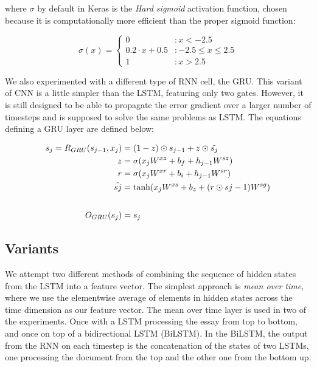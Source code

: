 where $\sigma$ by default in Keras is the \emph{Hard sigmoid} activation
function, chosen because it is computationally more efficient than the proper
sigmoid function:

\begin{equation}
  \sigma(x) = \begin{cases}
    0                 & : x < -2.5 \\
    0.2 \cdot x + 0.5 & : -2.5 \leq x \leq 2.5 \\
    1                 & : x > 2.5
  \end{cases}
\end{equation}

We also experimented with a different type of \ac{RNN} cell, the \ac{GRU}.
This variant of \ac{CNN} is a little simpler than the \ac{LSTM}, featuring
only two gates. However, it is still designed to be able to propagate the
error gradient over a larger number of timesteps and is supposed to solve the
same problems as \ac{LSTM}. The equations defining a \ac{GRU} layer are
defined below:

\begin{equation}
  \begin{aligned}
  s_j = R_{GRU}(s_{j-1}, x_j) &= (1 - z) \odot s_{j-1} + z \odot \tilde{s_{j}} \\
                            z &= \sigma(x_j W^{xz} + b_f + h_{j-1} W^{sz}) \\
                            r &= \sigma(x_j W^{xr} + b_i + h_{j-1} W^{sr}) \\
                 \tilde{s{j}} &= \tanh(x_j W^{xs} + b_z + (r \odot s{j-1}) W^{sg}) \\
  \\[1\jot]
                 O_{GRU}(s_j) &= s_j
  \end{aligned}
\end{equation}


\subsection{Variants}

We attempt two different methods of combining the sequence of hidden states
from the \ac{LSTM} into a feature vector. The simplest approach is \emph{mean
over time}, where we use the elementwise average of elements in hidden states
across the time dimension as our feature vector. The mean over time layer is
used in two of the experiments. Once with a \ac{LSTM} processing the essay
from top to bottom, and once on top of a bidirectional LSTM (BiLSTM). In the
BiLSTM, the output from the \ac{RNN} on each timestep is the concatenation of
the states of two \acp{LSTM}, one processing the document from the top and
the other one from the bottom up.

